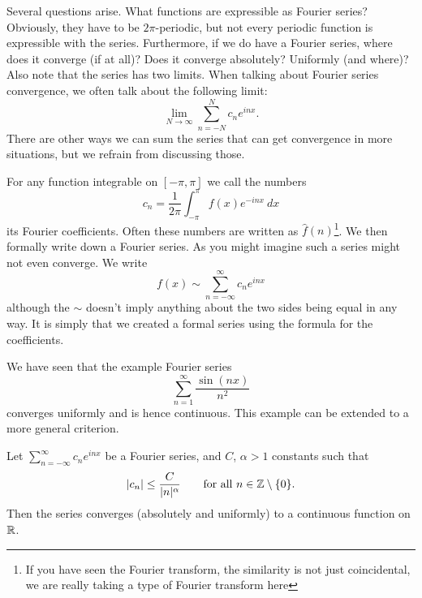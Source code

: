 Several questions arise.  What functions are expressible as 
Fourier series?  Obviously, they have to be $2\pi$-periodic, but not every
periodic function is expressible with the series.  Furthermore, if we do have
a Fourier series, where does it converge (if at all)?  Does it converge
absolutely?  Uniformly (and where)?  Also note that the series has two
limits.  When talking about Fourier series convergence, we often
talk about the following limit:
\begin{equation*}
\lim_{N\to\infty} 
\sum_{n=-N}^N c_n e^{inx} .
\end{equation*}
There are other ways we can sum the series that can get convergence in more
situations, but we refrain from discussing those.

For any function integrable on $[-\pi,\pi]$ we call the numbers
\begin{equation*}
c_n = 
\frac{1}{2\pi} \int_{-\pi}^\pi
f(x) e^{-inx} ~ dx
\end{equation*}
its Fourier coefficients.  Often these numbers are
written as $\hat{f}(n)$\footnote{If you have seen the Fourier transform,
the similarity is not just
coincidental, we are really taking a type of Fourier transform here}.
We then formally write down a Fourier series.
As you might imagine such a series might not even converge.
We write
\begin{equation*}
f(x) \sim
\sum_{n=-\infty}^\infty c_n e^{inx}
\end{equation*}
although the $\sim$ doesn't imply anything about the two sides being equal
in any way.  It is simply that we created a formal series using the formula
for the coefficients.

We have seen that the example Fourier series 
\begin{equation*}
\sum_{n=1}^\infty \frac{\sin(nx)}{n^2}
\end{equation*}
converges uniformly and is hence continuous.  This 
example can be extended to a more general criterion.

\begin{prop}
Let $\sum_{n=-\infty}^\infty c_n e^{inx}$ be a Fourier series,
and $C$, $\alpha > 1$ constants such that
\begin{equation*}
\lvert {c_n} \rvert \leq \frac{C}{\lvert {n} \rvert^\alpha}
\qquad \text{for all $n \in {\mathbb{Z}} \setminus \{ 0 \}$}.
\end{equation*}
Then the series converges (absolutely and uniformly) to a continuous function on ${\mathbb{R}}$.
\end{prop}

